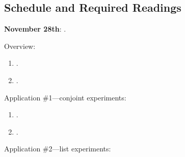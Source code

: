 \documentclass[letterpaper]{article}
\renewenvironment{itemize}{
  \begin{list}{}{
    \setlength{\leftmargin}{1.5em}
  }
}{
  \end{list}
}
\begin{document}
\subsection*{Schedule and Required Readings}


\begin{enumerate}
	\item {\bf November 28th}: {\color{ForestGreen}{\bf Survey Experiments}}.

			\begin{itemize} 

        \item[$\diamond$] Overview:

        \begin{enumerate}

          \item[$\bullet$] \href{https://www.cambridge.org/core/product/identifier/S1047198700006343/type/journal_article}{}.

          \item[$\bullet$] \href{https://www.cambridge.org/core/product/identifier/S2052263015000196/type/journal_article}{}.

        \end{enumerate}

       \item[$\diamond$] Application \#1---conjoint experiments:

           \begin{enumerate}

           \item[$\bullet$] \href{https://www.cambridge.org/core/product/identifier/9781108777919%23c2/type/book_part}{\fullcite{Bansak2021}}.

           \item[$\bullet$] \href{https://www.cambridge.org/core/product/identifier/S1047198700013589/type/journal_article}{}.

         \end{enumerate}

        \item[$\diamond$] Application \#2---list experiments:

          \begin{enumerate}


\end{enumerate}
\end{itemize}
\end{enumerate}
\end{document}

